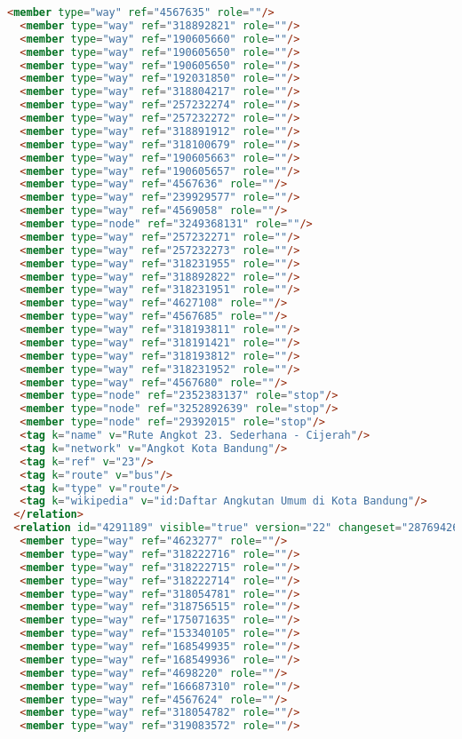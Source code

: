 \begin{lstlisting}[language=HTML,basicstyle=\tiny,caption=test.xml]
  <member type="way" ref="4567635" role=""/>
  <member type="way" ref="318892821" role=""/>
  <member type="way" ref="190605660" role=""/>
  <member type="way" ref="190605650" role=""/>
  <member type="way" ref="190605650" role=""/>
  <member type="way" ref="192031850" role=""/>
  <member type="way" ref="318804217" role=""/>
  <member type="way" ref="257232274" role=""/>
  <member type="way" ref="257232272" role=""/>
  <member type="way" ref="318891912" role=""/>
  <member type="way" ref="318100679" role=""/>
  <member type="way" ref="190605663" role=""/>
  <member type="way" ref="190605657" role=""/>
  <member type="way" ref="4567636" role=""/>
  <member type="way" ref="239929577" role=""/>
  <member type="way" ref="4569058" role=""/>
  <member type="node" ref="3249368131" role=""/>
  <member type="way" ref="257232271" role=""/>
  <member type="way" ref="257232273" role=""/>
  <member type="way" ref="318231955" role=""/>
  <member type="way" ref="318892822" role=""/>
  <member type="way" ref="318231951" role=""/>
  <member type="way" ref="4627108" role=""/>
  <member type="way" ref="4567685" role=""/>
  <member type="way" ref="318193811" role=""/>
  <member type="way" ref="318191421" role=""/>
  <member type="way" ref="318193812" role=""/>
  <member type="way" ref="318231952" role=""/>
  <member type="way" ref="4567680" role=""/>
  <member type="node" ref="2352383137" role="stop"/>
  <member type="node" ref="3252892639" role="stop"/>
  <member type="node" ref="29392015" role="stop"/>
  <tag k="name" v="Rute Angkot 23. Sederhana - Cijerah"/>
  <tag k="network" v="Angkot Kota Bandung"/>
  <tag k="ref" v="23"/>
  <tag k="route" v="bus"/>
  <tag k="type" v="route"/>
  <tag k="wikipedia" v="id:Daftar Angkutan Umum di Kota Bandung"/>
 </relation>
 <relation id="4291189" visible="true" version="22" changeset="28769426" timestamp="2015-02-11T10:05:22Z" user="shravan91" uid="1051550">
  <member type="way" ref="4623277" role=""/>
  <member type="way" ref="318222716" role=""/>
  <member type="way" ref="318222715" role=""/>
  <member type="way" ref="318222714" role=""/>
  <member type="way" ref="318054781" role=""/>
  <member type="way" ref="318756515" role=""/>
  <member type="way" ref="175071635" role=""/>
  <member type="way" ref="153340105" role=""/>
  <member type="way" ref="168549935" role=""/>
  <member type="way" ref="168549936" role=""/>
  <member type="way" ref="4698220" role=""/>
  <member type="way" ref="166687310" role=""/>
  <member type="way" ref="4567624" role=""/>
  <member type="way" ref="318054782" role=""/>
  <member type="way" ref="319083572" role=""/>

\end{lstlisting}
